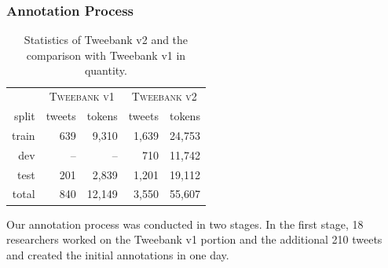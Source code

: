 \documentclass[11pt,a4paper]{article}
\newcommand{\nss}[1]{\textcolor{magenta}{[$_\mathrm{S}^\mathrm{NS}$#1]}}
\begin{document}
\subsubsection{Annotation Process}
\begin{table}
	\centering
	\begin{tabular}{rrrrr}
		 & \multicolumn{2}{c}{\textsc{Tweebank v1}} & \multicolumn{2}{c}{\textsc{Tweebank v2}} \\
		split & tweets & tokens & tweets & tokens \\
		\hline
		train & 639 & 9,310 & 1,639 & 24,753 \\
		dev & --\hphantom{0} & --\hphantom{00} & 710 & 11,742 \\
		test & 201 & 2,839 & 1,201 & 19,112 \\
		\hline
		total & 840 & 12,149 & 3,550 & 55,607 \\
	\end{tabular}

\caption{Statistics of {\sc Tweebank v2} and the comparison with
{\sc Tweebank v1} in quantity.
\label{tbl:data-stat}
}
\end{table}
Our annotation process was conducted in two stages.
In the first stage, 18 researchers worked on the {\sc Tweebank v1}
portion and the additional 210 tweets and created the initial annotations in one day.
\end{document}

